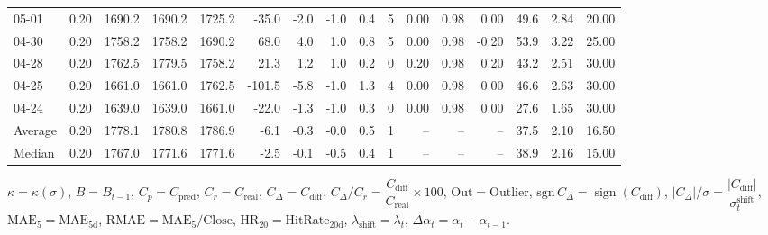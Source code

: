 \begin{threeparttable}
{\begin{tabular}{lrrrrrrrrrrrrrrr}
  05-01 &     0.20 & 1690.2 & 1690.2 & 1725.2 &      -35.0 &           -2.0 &                     -1.0 &                 0.4 &              5 &       0.00 &      0.98 &           0.00 &             49.6 &            2.84 &                  20.00 \\
  04-30 &     0.20 & 1758.2 & 1758.2 & 1690.2 &       68.0 &            4.0 &                      1.0 &                 0.8 &              5 &       0.00 &      0.98 &          -0.20 &             53.9 &            3.22 &                  25.00 \\
  04-28 &     0.20 & 1762.5 & 1779.5 & 1758.2 &       21.3 &            1.2 &                      1.0 &                 0.2 &              0 &       0.20 &      0.98 &           0.20 &             43.2 &            2.51 &                  30.00 \\
  04-25 &     0.20 & 1661.0 & 1661.0 & 1762.5 &     -101.5 &           -5.8 &                     -1.0 &                 1.3 &              4 &       0.00 &      0.98 &           0.00 &             46.6 &            2.63 &                  30.00 \\
  04-24 &     0.20 & 1639.0 & 1639.0 & 1661.0 &      -22.0 &           -1.3 &                     -1.0 &                 0.3 &              0 &       0.00 &      0.98 &           0.00 &             27.6 &            1.65 &                  30.00 \\
Average &     0.20 & 1778.1 & 1780.8 & 1786.9 &       -6.1 &           -0.3 &                     -0.0 &                 0.5 &              1 &         -- &        -- &             -- &             37.5 &            2.10 &                  16.50 \\
 Median &     0.20 & 1767.0 & 1771.6 & 1771.6 &       -2.5 &           -0.1 &                     -0.5 &                 0.4 &              1 &         -- &        -- &             -- &             38.9 &            2.16 &                  15.00 \\
\bottomrule
\end{tabular}
}
\begin{tablenotes}\footnotesize
\item $\kappa=\kappa(\sigma)$, $B=B_{t-1}$, $C_p=C_{\text{pred}}$, $C_r=C_{\text{real}}$, $C_\Delta=C_{\text{diff}}$, $C_\Delta/C_r=\dfrac{C_{\text{diff}}}{C_{\text{real}}}\times100$, $\mathrm{Out}=\text{Outlier}$, $\mathrm{sgn}\,C_\Delta=\operatorname{sign}(C_{\text{diff}})$, $|C_\Delta|/\sigma=\dfrac{|C_{\text{diff}}|}{\sigma_t^{\text{shift}}}$, $\mathrm{MAE}_5=\mathrm{MAE}_{5\text{d}}$, $\mathrm{RMAE}= \mathrm{MAE}_5 / \text{Close}$, $\mathrm{HR}_{20}=\mathrm{HitRate}_{20\text{d}}$, 
$\lambda_{\text{shift}}=\lambda_t$, 
$\Delta\alpha_t=\alpha_t-\alpha_{t-1}$.
\end{tablenotes}
\end{threeparttable}
\endgroup

